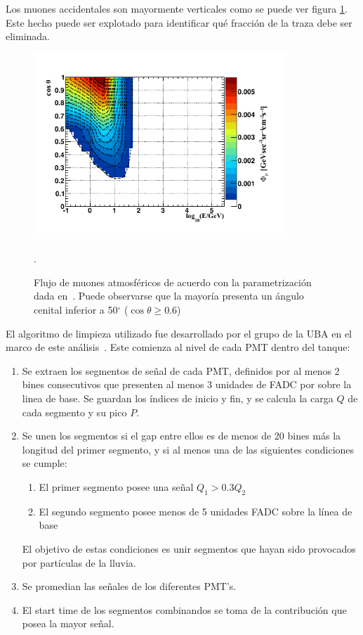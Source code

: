 		Los muones accidentales son mayormente verticales como se puede ver figura \ref{fig:atmo_mu_flux}.
		Este hecho puede ser explotado para identificar qué fracción de la traza debe ser eliminada.
		\begin{figure}[ht]
		\begin{center}
		\includegraphics[width=0.85\textwidth]{fig/seleccionAuger/atmo_mu_flux.pdf}
		\caption{Flujo de muones atmosféricos de acuerdo con la parametrización dada en~\cite{cite:atmo_mu}. Puede observarse que la mayoría presenta un ángulo cenital inferior a 50$^{\circ}$ ($\cos\theta \geqslant 0.6$)}.
		\label{fig:atmo_mu_flux}
		\end{center}
		\end{figure}
		
		El algoritmo de limpieza utilizado fue desarrollado por el grupo de la UBA en el marco de este análisis~\cite{trace_cleaning}.
		Este comienza al nivel de cada PMT dentro del tanque:
		\begin{enumerate}
		 \item Se extraen los segmentos de señal de cada PMT, definidos por al menos 2 bines consecutivos que presenten al menos 3 unidades de FADC por sobre la linea de base.
		 Se guardan los índices de inicio y fin, y se calcula la carga $Q$ de cada segmento y su pico $P$.
		 \item Se unen los segmentos si el gap entre ellos es de menos de 20 bines más la longitud del primer segmento, y si al menos una de las siguientes condiciones se cumple:
		 \begin{enumerate}
		  \item El primer segmento posee una señal $Q_1>0.3Q_2$
		  \item El segundo segmento posee menos de 5 unidades FADC sobre la línea de base
		 \end{enumerate}
		El objetivo de estas condiciones es unir segmentos que hayan sido provocados por partículas de la lluvia.
		\item Se promedian las señales de los diferentes PMT's.
		\item El start time de los segmentos combinandos se toma de la contribución que posea la mayor señal.
		\end{enumerate}
		
